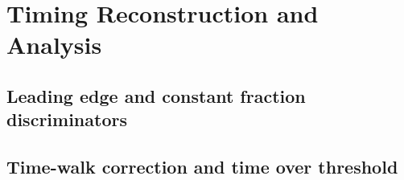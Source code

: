 \documentclass[preprint,1p]{elsarticle}
\begin{document}
\section{Timing Reconstruction and Analysis}
\label{sec:timing_and_analysis}

\subsection{Leading edge and constant fraction discriminators}
\label{sec:le_and_cfd}

\subsection{Time-walk correction and time over threshold}
\label{sec:tw_and_tot}


\end{document}
